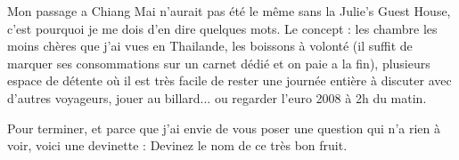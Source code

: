 \begin{multicols}{2}
Mon passage a Chiang Mai n'aurait pas été le même sans la Julie's Guest House, c'est pourquoi je me dois d'en dire quelques mots. Le concept : les chambre les moins chères que j'ai vues en Thailande, les boissons à volonté (il suffit de marquer ses consommations sur un carnet dédié et on paie a la fin), plusieurs espace de détente où il est très facile de rester une journée entière à discuter avec d'autres voyageurs, jouer au billard... ou regarder l'euro 2008 à 2h du matin.


Pour terminer, et parce que j'ai envie de vous poser une question qui n'a rien à voir, voici une devinette : Devinez le nom de ce très bon fruit.


\end{multicols}


